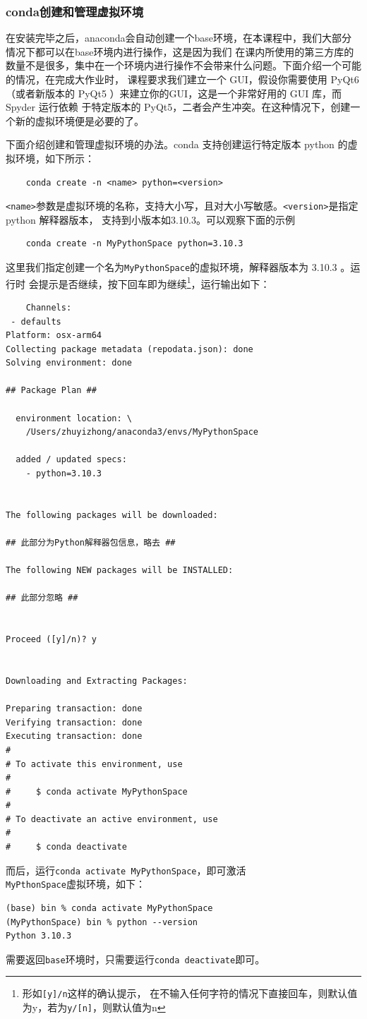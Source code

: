 \subsubsection{conda创建和管理虚拟环境}
在安装完毕之后，anaconda会自动创建一个base环境，在本课程中，我们大部分情况下都可以在base环境内进行操作，这是因为我们
在课内所使用的第三方库的数量不是很多，集中在一个环境内进行操作不会带来什么问题。下面介绍一个可能的情况，在完成大作业时，
课程要求我们建立一个 GUI，假设你需要使用 PyQt6 （或者新版本的 PyQt5 ）来建立你的GUI，这是一个非常好用的 GUI 库，而 Spyder 运行依赖
于特定版本的 PyQt5，二者会产生冲突。在这种情况下，创建一个新的虚拟环境便是必要的了。

下面介绍创建和管理虚拟环境的办法。conda 支持创建运行特定版本 python 的虚拟环境，如下所示：
\begin{lstlisting}
    conda create -n <name> python=<version>
\end{lstlisting}
\texttt{<name>}参数是虚拟环境的名称，支持大小写，且对大小写敏感。\texttt{<version>}是指定 python 解释器版本，
支持到小版本如3.10.3。可以观察下面的示例
\begin{lstlisting}
    conda create -n MyPythonSpace python=3.10.3
\end{lstlisting}
这里我们指定创建一个名为\texttt{MyPythonSpace}的虚拟环境，解释器版本为 3.10.3 。运行时
会提示是否继续，按下回车即为继续\footnote{形如\texttt{[y]/n}这样的确认提示，
在不输入任何字符的情况下直接回车，则默认值为y，若为\texttt{y/[n]}，则默认值为n}，运行输出如下：
\begin{lstlisting}
    Channels:
 - defaults
Platform: osx-arm64
Collecting package metadata (repodata.json): done
Solving environment: done

## Package Plan ##

  environment location: \
    /Users/zhuyizhong/anaconda3/envs/MyPythonSpace

  added / updated specs:
    - python=3.10.3


The following packages will be downloaded:

## 此部分为Python解释器包信息，略去 ##

The following NEW packages will be INSTALLED:

## 此部分忽略 ##


Proceed ([y]/n)? y


Downloading and Extracting Packages:
                                                                                                            
Preparing transaction: done
Verifying transaction: done
Executing transaction: done
#
# To activate this environment, use
#
#     $ conda activate MyPythonSpace
#
# To deactivate an active environment, use
#
#     $ conda deactivate

\end{lstlisting}
而后，运行\texttt{conda activate MyPythonSpace}，即可激活\\\texttt{MyPthonSpace}虚拟环境，如下：
\begin{lstlisting}
(base) bin % conda activate MyPythonSpace
(MyPythonSpace) bin % python --version
Python 3.10.3
\end{lstlisting}
需要返回\texttt{base}环境时，只需要运行\texttt{conda deactivate}即可。

